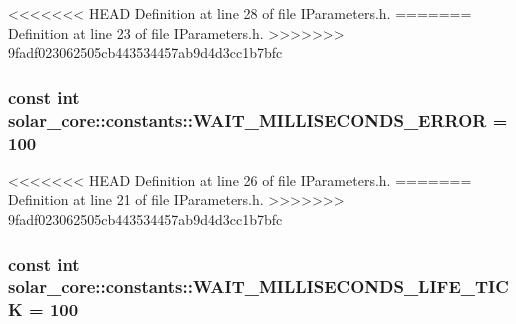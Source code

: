 <<<<<<< HEAD
Definition at line 28 of file I\+Parameters.\+h.
=======
Definition at line 23 of file I\+Parameters.\+h.
>>>>>>> 9fadf023062505cb443534457ab9d4d3cc1b7bfc

\hypertarget{namespacesolar__core_1_1constants_a4cddd8d733f9237d6fb56197354fed46}{}
\subsubsection[{W\+A\+I\+T\+\_\+\+M\+I\+L\+L\+I\+S\+E\+C\+O\+N\+D\+S\+\_\+\+E\+R\+R\+O\+R}]{\setlength{\rightskip}{0pt plus 5cm}const int solar\+\_\+core\+::constants\+::\+W\+A\+I\+T\+\_\+\+M\+I\+L\+L\+I\+S\+E\+C\+O\+N\+D\+S\+\_\+\+E\+R\+R\+O\+R = 100}\label{namespacesolar__core_1_1constants_a4cddd8d733f9237d6fb56197354fed46}


<<<<<<< HEAD
Definition at line 26 of file I\+Parameters.\+h.
=======
Definition at line 21 of file I\+Parameters.\+h.
>>>>>>> 9fadf023062505cb443534457ab9d4d3cc1b7bfc

\hypertarget{namespacesolar__core_1_1constants_ab90981a98985a16f6e239808f36186d7}{}
\subsubsection[{W\+A\+I\+T\+\_\+\+M\+I\+L\+L\+I\+S\+E\+C\+O\+N\+D\+S\+\_\+\+L\+I\+F\+E\+\_\+\+T\+I\+C\+K}]{\setlength{\rightskip}{0pt plus 5cm}const int solar\+\_\+core\+::constants\+::\+W\+A\+I\+T\+\_\+\+M\+I\+L\+L\+I\+S\+E\+C\+O\+N\+D\+S\+\_\+\+L\+I\+F\+E\+\_\+\+T\+I\+C\+K = 100}\label{namespacesolar__core_1_1constants_ab90981a98985a16f6e239808f36186d7}


